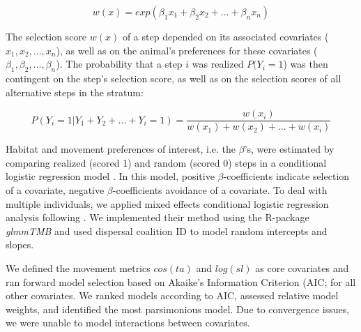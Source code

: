 \documentclass[abstract=off,10pt,a4paper,bibliography=totocnumbered]{article}
\begin{document}
\begin{equation}
\label{EQ2}
  w(x) = exp(\beta_1 x_1 + \beta_2 x_2 + ... + \beta_n x_n)
\end{equation}

The selection score \(w(x)\) of a step depended on its associated covariates
(\(x_1, x_2, ..., x_n\)), as well as on the animal's preferences for these
covariates (\(\beta_1, \beta_2, ..., \beta_n\)). The probability that a step
\(i\) was realized \(P(Y_{i} = 1\)) was then contingent on the step's selection
score, as well as on the selection scores of all alternative steps in the
stratum:

\begin{equation}
\label{EQ3}
  P(Y_{i} = 1 | Y_{1} + Y_{2} + ... + Y_{i} = 1) =
  \frac{w(x_{i})}{w(x_{1}) + w(x_{2}) + ... + w(x_{i})}
\end{equation}

\noindent Habitat and movement preferences of interest, i.e. the \(\beta\)'s,
were estimated by comparing realized (scored 1) and random (scored 0) steps in a
conditional logistic regression model \citep{Fortin.2005}. In this model,
positive \(\beta\)-coefficients indicate selection of a covariate, negative
\(\beta\)-coefficients avoidance of a covariate. To deal with multiple
individuals, we applied mixed effects conditional logistic regression analysis
following \cite{Muff.2020}. We implemented their method using the R-package
\textit{glmmTMB} \citep{Mollie.2017} and used dispersal coalition ID to model
random intercepts and slopes.

We defined the movement metrics \(cos(ta)\) and \(log(sl)\) as core covariates
and ran forward model selection based on Akaike's Information Criterion (AIC;
\citealp{Burnham.2002} for all other covariates. We ranked models according to
AIC, assessed relative model weights, and identified the most parsimonious
model. Due to convergence issues, we were unable to model interactions between
covariates.
\end{document}
